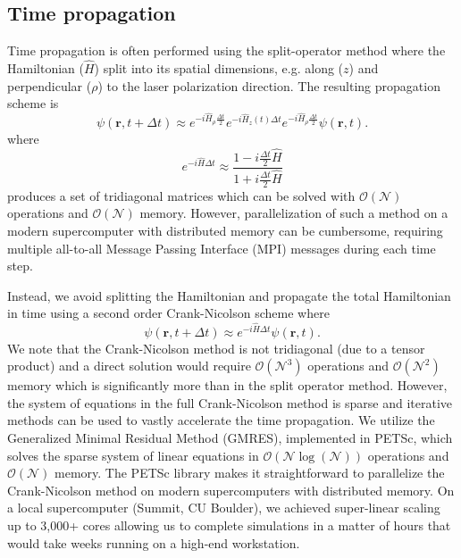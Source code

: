 \subsection{Time propagation} %
\label{sub:time_propagation}
Time propagation is often performed using the split-operator method where the Hamiltonian ($\hat{H}$) split into its spatial dimensions, e.g. along ($z$) and perpendicular ($\rho$) to the laser polarization direction. The resulting propagation scheme is
%
\begin{equation}
    \psi(\mathbf{r},t+\Delta t) \approx e^{-i\hat{H}_{\rho}\frac{\Delta t}{2}} e^{-i\hat{H}_z(t)\Delta t} e^{-i\hat{H}_{\rho}\frac{\Delta t}{2}}\psi(\mathbf{r},t).
     \label{eq:Split-operator}
\end{equation}
%
where
\begin{equation}
    e^{-i\hat{H}\Delta t} \approx \frac{1-i\frac{\Delta t}{2} \hat{H}}{1+i\frac{\Delta t}{2} \hat{H}}
\end{equation}
produces a set of tridiagonal matrices which can be solved with $\mathcal{O}(\mathcal{N})$ operations and $\mathcal{O}(\mathcal{N})$ memory. However, parallelization of such a method on a modern supercomputer with distributed memory can be cumbersome, requiring multiple all-to-all Message Passing Interface (MPI) messages during each time step.

Instead, we avoid splitting the Hamiltonian and propagate the total Hamiltonian in time using a second order Crank-Nicolson scheme where
%
\begin{equation}
    \psi(\mathbf{r},t+\Delta t) \approx e^{-i\hat{H}\Delta t}\psi(\mathbf{r},t).
    \label{eq:Crank_Nicolson}
\end{equation}
%
We note that the Crank-Nicolson method is not tridiagonal (due to a tensor product) and a direct solution would require $\mathcal{O}(\mathcal{N}^3)$ operations and $\mathcal{O}(\mathcal{N}^2)$ memory which is significantly more than in the split operator method. However, the system of equations in the full Crank-Nicolson method is sparse and iterative methods can be used to vastly accelerate the time propagation. We utilize the Generalized Minimal Residual Method (GMRES), implemented in PETSc, which solves the sparse system of linear equations in $\mathcal{O}(\mathcal{N}\log(\mathcal{N}))$ operations and $\mathcal{O}(\mathcal{N})$ memory. The PETSc library makes it straightforward to parallelize the Crank-Nicolson method on modern supercomputers with distributed memory. On a local supercomputer (Summit, CU Boulder), we achieved super-linear scaling up to 3,000+ cores allowing us to complete simulations in a matter of hours that would take weeks running on a high-end workstation. 



